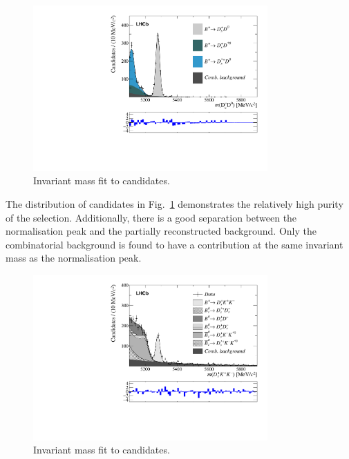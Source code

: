 \begin{figure}[!h]
    \centering
    \includegraphics[width=0.8\textwidth]{figs/B2DsKK/Fit_DsD0.pdf}
    \caption{Invariant mass fit to \decay{\Bp}{\Dsp\Dzb} candidates.}
    \label{fig:B2DsKK_fit_B2DsD0}   
\end{figure}

The distribution of \decay{\Bp}{\Dsp\Dzb} candidates in Fig.~\ref{fig:B2DsKK_fit_B2DsD0} demonstrates the relatively high purity of the selection. Additionally, there is a good separation between the normalisation peak and the partially reconstructed background. Only the combinatorial background is found to have a contribution at the same invariant mass as the normalisation peak. 


\begin{figure}[!h]
    \centering
    \includegraphics[width=0.8\textwidth]{figs/B2DsKK/Fit_DsKK.pdf}
    \caption{Invariant mass fit to \decay{\Bp}{\Dsp\Kp\Km} candidates.}
    \label{fig:B2DsKK_fit_B2DsKK}   
\end{figure}

